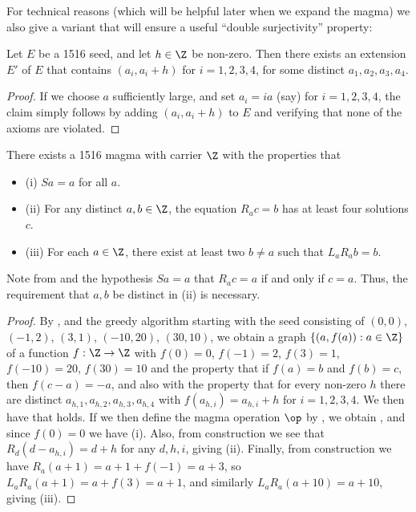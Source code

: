 For technical reasons (which will be helpful later when we expand the magma) we also give a variant that will ensure a useful ``double surjectivity'' property:

\begin{lemma}\label{1516-ext-var}  Let $E$ be a 1516 seed, and let $h \in \Z$ be non-zero.  Then there exists an extension $E'$ of $E$ that contains $(a_i,a_i+h)$ for $i=1, 2, 3, 4$, for some distinct $a_1, a_2, a_3, a_4$.
\end{lemma}

\begin{proof}  If we choose $a$ sufficiently large, and set $a_i = i a$ (say) for $i=1, 2, 3, 4$, the claim simply follows by adding $(a_i,a_i+h)$ to $E$ and verifying that none of the axioms are violated.
\end{proof}


\begin{corollary}\label{1516-base} There exists a 1516 magma with carrier $\Z$ with the properties that
  \begin{itemize}
    \item (i) $Sa=a$ for all $a$.
    \item (ii) For any distinct $a,b \in \Z$, the equation $R_a c = b$ has at least four solutions $c$.
    \item (iii) For each $a \in \Z$, there exist at least two $b \neq a$ such that $L_a R_a b = b$.
  \end{itemize}
\end{corollary}


Note from  and the hypothesis $Sa=a$ that $R_a c = a$ if and only if $c=a$.  Thus, the requirement that $a,b$ be distinct in (ii) is necessary.

\begin{proof}  By ,  and the greedy algorithm starting with the seed consisting of $(0,0)$, $(-1,2)$, $(3,1)$, $(-10,20)$, $(30,10)$, we obtain a graph $\{ (a,f(a)): a \in \Z \}$ of a function $f:\Z \to \Z$ with $f(0)=0$, $f(-1)=2$, $f(3)=1$, $f(-10) = 20$, $f(30)=10$ and the property that if $f(a)=b$ and $f(b)=c$, then $f(c-a)=-a$, and also with the property that for every non-zero $h$ there are distinct $a_{h,1}, a_{h,2}, a_{h,3}, a_{h,4}$ with $f(a_{h,i})=a_{h,i}+h$ for $i=1, 2, 3, 4$.
We then have that  holds.  If we then define the magma operation $\op$ by , we obtain , and since $f(0)=0$ we have (i).  Also, from construction we see that $R_d (d - a_{h,i}) = d+h$ for any $d,h,i$, giving (ii).  Finally, from construction we have $R_a (a+1) = a+1+f(-1) = a+3$, so $L_a R_a (a+1) = a + f(3) = a+1$, and similarly $L_a R_a (a+10) = a+10$, giving (iii).
\end{proof}

